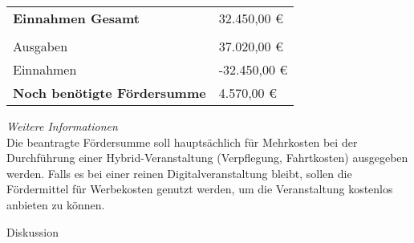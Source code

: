 {\begin{longtable}{p{12cm} p{3cm}}
        \textbf{Einnahmen Gesamt} & 32.450,00 €\\
        \\
        Ausgaben & 37.020,00 €\\
        Einnahmen & -32.450,00 €\\
        \textbf{Noch benötigte Fördersumme} & 4.570,00 €\\
    \end{longtable}
    \vspace*{2em}
    \emph{Weitere Informationen}\\
    Die beantragte Fördersumme soll hauptsächlich für Mehrkosten bei der Durchführung einer Hybrid-Veranstaltung (Verpflegung, Fahrtkosten) ausgegeben werden. Falls es bei einer reinen Digitalveranstaltung bleibt, sollen die Fördermittel für Werbekosten genutzt werden, um die Veranstaltung kostenlos anbieten zu können.
}{
    Diskussion
}

